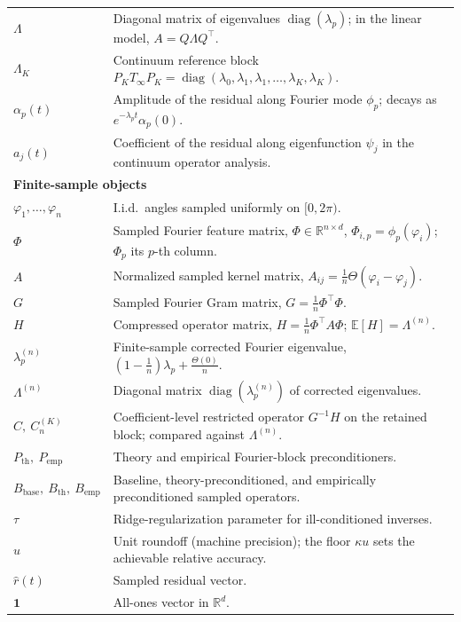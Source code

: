 \begin{longtable}{p{} p{}}
$\Lambda$ & Diagonal matrix of eigenvalues $\operatorname{diag}(\lambda_p)$; in the linear model, $A=Q\Lambda Q^\top$. \\[0.4em]
$\Lambda_K$ & Continuum reference block $P_K T_\infty P_K=\operatorname{diag}(\lambda_0,\lambda_1,\lambda_1,\dots,\lambda_K,\lambda_K)$. \\[0.4em]
$\alpha_p(t)$ & Amplitude of the residual along Fourier mode $\phi_p$; decays as $e^{-\lambda_p t}\alpha_p(0)$. \\[0.4em]
$a_j(t)$ & Coefficient of the residual along eigenfunction $\psi_j$ in the continuum operator analysis. \\[0.6em]

\multicolumn{2}{l}{\textbf{Finite-sample objects}}\\[0.3em]
$\varphi_1,\dots,\varphi_n$ & I.i.d.\ angles sampled uniformly on $[0,2\pi)$. \\[0.4em]
$\Phi$ & Sampled Fourier feature matrix, $\Phi\in\mathbb{R}^{n\times d}$, $\Phi_{i,p}=\phi_p(\varphi_i)$; $\Phi_p$ its $p$-th column. \\[0.4em]
$A$ & Normalized sampled kernel matrix, $A_{ij}=\tfrac1n\Theta(\varphi_i-\varphi_j)$. \\[0.4em]
$G$ & Sampled Fourier Gram matrix, $G=\tfrac1n\Phi^\top\Phi$. \\[0.4em]
$H$ & Compressed operator matrix, $H=\tfrac1n\Phi^\top A\Phi$; $\mathbb{E}[H]=\Lambda^{(n)}$. \\[0.4em]
$\lambda_p^{(n)}$ & Finite-sample corrected Fourier eigenvalue, $(1-\tfrac1n)\lambda_p+\tfrac{\Theta(0)}{n}$. \\[0.4em]
$\Lambda^{(n)}$ & Diagonal matrix $\operatorname{diag}(\lambda_p^{(n)})$ of corrected eigenvalues. \\[0.4em]
$C,\ C_n^{(K)}$ & Coefficient-level restricted operator $G^{-1}H$ on the retained block; compared against $\Lambda^{(n)}$. \\[0.4em]
$P_{\mathrm{th}},\ P_{\mathrm{emp}}$ & Theory and empirical Fourier-block preconditioners. \\[0.4em]
$B_{\mathrm{base}},\ B_{\mathrm{th}},\ B_{\mathrm{emp}}$ & Baseline, theory-preconditioned, and empirically preconditioned sampled operators. \\[0.4em]
$\tau$ & Ridge-regularization parameter for ill-conditioned inverses. \\[0.4em]
$u$ & Unit roundoff (machine precision); the floor $\kappa u$ sets the achievable relative accuracy. \\[0.4em]
$\widehat{r}(t)$ & Sampled residual vector. \\[0.4em]
$\mathbf{1}$ & All-ones vector in $\mathbb{R}^d$. \\[0.6em]


\end{longtable}
